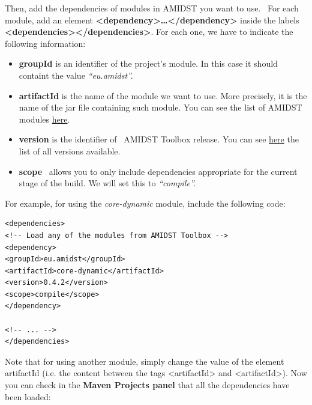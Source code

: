 \documentclass[10pt,a4paper]{article}
\begin{document}
Then, add the dependencies of modules in AMIDST you want to use.~
For each module, add an element \textbf{\textless{}dependency\textgreater{}\textbf{\ldots{}\textless{}/dependency\textgreater{}}}
inside the labels
\textbf{\textless{}dependencies\textgreater{}\textless{}/dependencies\textgreater{}}. For each one, we have to indicate the following
information:\newline

\begin{itemize}
	\item
	\textbf{groupId} is an identifier of the project's module. In this case it
	should containt the value \emph{``eu.amidst''.}
	\item
	\textbf{artifactId }is the name of the module we want to use. More precisely,
	it is the name of the jar file containing such module. You can see the
	list of AMIDST modules
	\href{https://github.com/amidst/toolbox/tree/mvn-repo/eu/amidst}{here}.
	\item
	\textbf{version} is the identifier of~ AMIDST Toolbox release. You can
	see
	\href{mohttps://github.com/amidst/toolbox/blob/master/CHANGELOG.mddules\%20here}{here}
	the list of all versions available.
	\item
	\textbf{scope}~ allows you to only include dependencies appropriate
	for the current stage of the build. We will set this to
	\emph{``compile''.}
\end{itemize}


\vspace{2mm}
\noindent For example, for using the \textit{core-dynamic }module, include the
following code:

\begin{verbatim}
<dependencies>
<!-- Load any of the modules from AMIDST Toolbox -->
<dependency>
<groupId>eu.amidst</groupId>
<artifactId>core-dynamic</artifactId>
<version>0.4.2</version>
<scope>compile</scope>
</dependency>

<!-- ... -->
</dependencies>        
\end{verbatim}

Note that for using another module,  simply change the value of the
element artifactId (i.e. the content between the tags
\textless{}artifactId\textgreater{} and
\textless{}artifactId\textgreater{}). Now you can check in the \textbf{Maven Projects panel }that all the
dependencies have been loaded:\newline 
\end{document}
